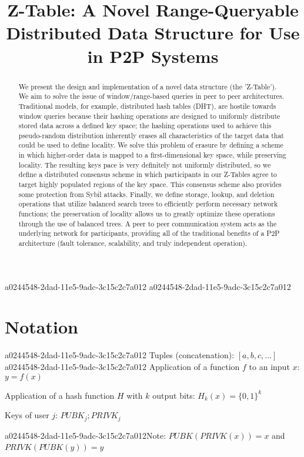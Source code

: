 \documentclass[12pt]{article}
\title{Z-Table: A Novel Range-Queryable Distributed Data Structure for Use in P2P Systems}
\begin{document}
\maketitle

\begin{abstract}
We present the design and implementation of a novel data structure (the 'Z-Table'). We aim to solve the issue of window/range-based queries in peer to peer architectures. Traditional models, for example,  distributed hash tables (DHT), are hostile towards window queries because their hashing operations are designed to uniformly distribute stored data across a defined key space; the hashing operations used to achieve this pseudo-random distribution inherently erases all characteristics of the target data that could be used to define locality. We solve this problem of erasure by defining a scheme in which higher-order data is mapped to a first-dimensional key space, while preserving locality. The resulting keys pace is very definitely not uniformly distributed, so we define a distributed consensus scheme in which participants in our Z-Tables agree to target highly populated regions of the key space. This consensus scheme also provides some protection from Sybil attacks. Finally, we define storage, lookup, and deletion operations that utilize balanced search trees to efficiently perform necessary network functions; the preservation of locality allows us to greatly optimize these operations through the use of balanced trees. A peer to peer communication system acts as the underlying network for participants, providing all of the traditional benefits of a P2P architecture (fault tolerance, scalability, and truly independent operation).
\end{abstract}
a0244548-2dad-11e5-9adc-3c15c2c7a012
a0244548-2dad-11e5-9adc-3c15c2c7a012\section{Notation}
a0244548-2dad-11e5-9adc-3c15c2c7a012
Tuples (concatenation): $[a,b,c,...]$
a0244548-2dad-11e5-9adc-3c15c2c7a012
Application of a function $f$ to an input $x$: $y=f(x)$

Application of a hash function $H$ with $k$ output bits: $H_{k}(x) = \{0,1\}^k$

Keys of user $j$: $ PUBK_j; PRIVK_j $

a0244548-2dad-11e5-9adc-3c15c2c7a012Note: $PUBK(PRIVK(x)) = x$ and $PRIVK(PUBK(y)) = y$~
\end{document}
